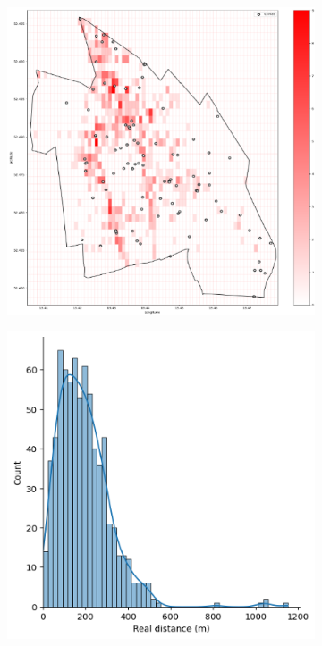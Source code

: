 \begin{figure}[h]
    \centering
    \begin{subfigure}[b]{0.45\textwidth}
        \centering
        \includegraphics[width=\textwidth]{./figures/Gerard/catering.png}
        \caption{}
        \label{fig:image1}
    \end{subfigure}
    \hfill
    \begin{subfigure}[b]{0.45\textwidth}
        \centering
        \includegraphics[width=\textwidth]{./figures/Gerard/catering_1.png}
        \caption{}
        \label{fig:image2}
    \end{subfigure}

\end{figure}

